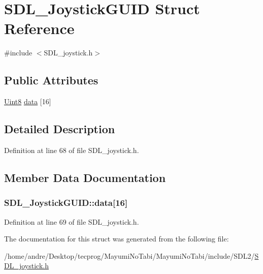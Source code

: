 \hypertarget{struct_s_d_l___joystick_g_u_i_d}{\section{S\-D\-L\-\_\-\-Joystick\-G\-U\-I\-D Struct Reference}
\label{struct_s_d_l___joystick_g_u_i_d}
}


{\ttfamily \#include $<$S\-D\-L\-\_\-joystick.\-h$>$}

\subsection*{Public Attributes}
\begin{DoxyCompactItemize}
\item 
\hyperlink{_s_d_l__stdinc_8h_a2944638813a090aa23e62f4da842c3e2}{Uint8} \hyperlink{struct_s_d_l___joystick_g_u_i_d_a16935b928a608fe98e0509f242590597}{data} \mbox{[}16\mbox{]}
\end{DoxyCompactItemize}


\subsection{Detailed Description}


Definition at line 68 of file S\-D\-L\-\_\-joystick.\-h.



\subsection{Member Data Documentation}
\hypertarget{struct_s_d_l___joystick_g_u_i_d_a16935b928a608fe98e0509f242590597}{
\subsubsection[{data}]{ S\-D\-L\-\_\-\-Joystick\-G\-U\-I\-D\-::data\mbox{[}16\mbox{]}}}\label{struct_s_d_l___joystick_g_u_i_d_a16935b928a608fe98e0509f242590597}


Definition at line 69 of file S\-D\-L\-\_\-joystick.\-h.



The documentation for this struct was generated from the following file\-:\begin{DoxyCompactItemize}
\item 
/home/andre/\-Desktop/tecprog/\-Mayumi\-No\-Tabi/\-Mayumi\-No\-Tabi/include/\-S\-D\-L2/\hyperlink{_s_d_l__joystick_8h}{S\-D\-L\-\_\-joystick.\-h}\end{DoxyCompactItemize}
